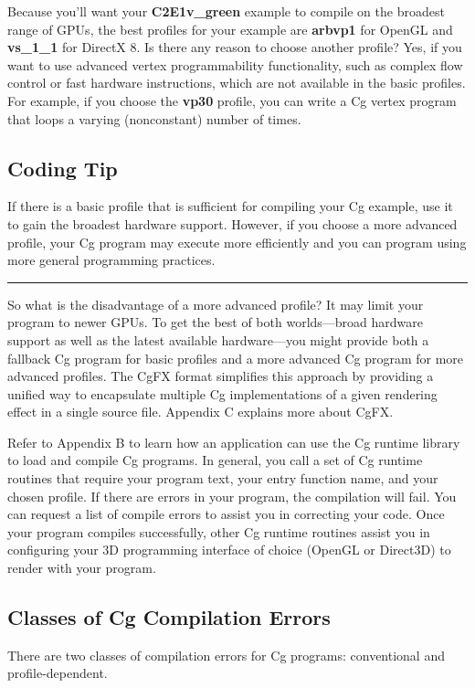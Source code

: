 \documentclass{book}
\begin{document}
Because you'll want your \textbf{C2E1v_green} example to compile on the broadest range of GPUs, the best profiles for your example are \textbf{arbvp1} for OpenGL and \textbf{vs_1_1} for DirectX 8. Is there any reason to choose another profile? Yes, if you want to use advanced vertex programmability functionality, such as complex flow control or fast hardware instructions, which are not available in the basic profiles. For example, if you choose the \textbf{vp30} profile, you can write a Cg vertex program that loops a varying (nonconstant) number of times.

\subsection*{Coding Tip}

If there is a basic profile that is sufficient for compiling your Cg example, use it to gain the broadest hardware support. However, if you choose a more advanced profile, your Cg program may execute more efficiently and you can program using more general programming practices.
\hrule

So what is the disadvantage of a more advanced profile? It may limit your program to newer GPUs. To get the best of both worlds—broad hardware support as well as the latest available hardware—you might provide both a fallback Cg program for basic profiles and a more advanced Cg program for more advanced profiles. The CgFX format simplifies this approach by providing a unified way to encapsulate multiple Cg implementations of a given rendering effect in a single source file. Appendix C explains more about CgFX.

Refer to Appendix B to learn how an application can use the Cg runtime library to load and compile Cg programs. In general, you call a set of Cg runtime routines that require your program text, your entry function name, and your chosen profile. If there are errors in your program, the compilation will fail. You can request a list of compile errors to assist you in correcting your code. Once your program compiles successfully, other Cg runtime routines assist you in configuring your 3D programming interface of choice (OpenGL or Direct3D) to render with your program.

\subsection{Classes of Cg Compilation Errors}

There are two classes of compilation errors for Cg programs: conventional and profile-dependent.
\end{document}
